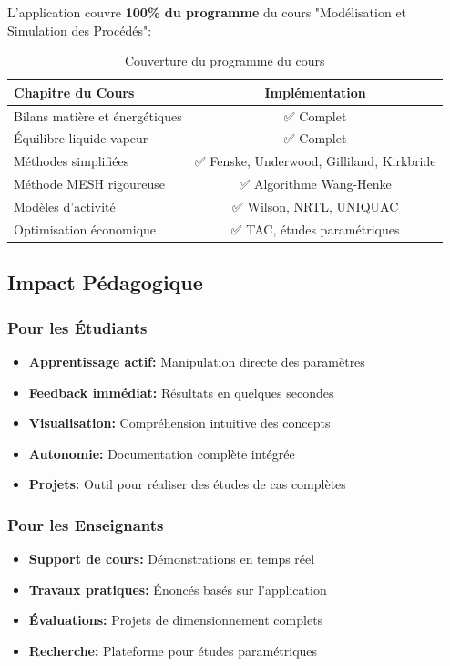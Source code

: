 \documentclass[11pt,a4paper]{article}
\begin{document}
L'application couvre \textbf{100\% du programme} du cours "Modélisation et Simulation des Procédés":

\begin{table}[h]
\centering
\begin{tabular}{lc}
\toprule
\textbf{Chapitre du Cours} & \textbf{Implémentation} \\
\midrule
Bilans matière et énergétiques & ✅ Complet \\
Équilibre liquide-vapeur & ✅ Complet \\
Méthodes simplifiées & ✅ Fenske, Underwood, Gilliland, Kirkbride \\
Méthode MESH rigoureuse & ✅ Algorithme Wang-Henke \\
Modèles d'activité & ✅ Wilson, NRTL, UNIQUAC \\
Optimisation économique & ✅ TAC, études paramétriques \\
\bottomrule
\end{tabular}
\caption{Couverture du programme du cours}
\end{table}

\subsection{Impact Pédagogique}

\subsubsection{Pour les Étudiants}

\begin{itemize}[leftmargin=*]
    \item \textbf{Apprentissage actif:} Manipulation directe des paramètres
    \item \textbf{Feedback immédiat:} Résultats en quelques secondes
    \item \textbf{Visualisation:} Compréhension intuitive des concepts
    \item \textbf{Autonomie:} Documentation complète intégrée
    \item \textbf{Projets:} Outil pour réaliser des études de cas complètes
\end{itemize}

\subsubsection{Pour les Enseignants}

\begin{itemize}[leftmargin=*]
    \item \textbf{Support de cours:} Démonstrations en temps réel
    \item \textbf{Travaux pratiques:} Énoncés basés sur l'application
    \item \textbf{Évaluations:} Projets de dimensionnement complets
    \item \textbf{Recherche:} Plateforme pour études paramétriques
\end{itemize}
\end{document}
